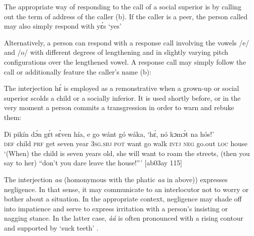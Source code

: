 The appropriate way of responding to the call of a social superior is by calling out the term of address of the caller (b). If the caller is a peer, the person called may also simply respond with yɛ́s ‘yes’



\ea%
    \label{ex:key:1652}
\z\z

Alternatively, a person can respond with a response call involving the vowels /e/ and /o/ with different degrees of lengthening and in slightly varying pitch configurations over the lengthened vowel. A response call may simply follow the call or additionally feature the caller’s name (b):


\ea%
    \label{ex:key:1653}
\z\z

The interjection hɛ́ is employed as a remonstrative when a grown-up or social superior scolds a child or a socially inferior. It is used shortly before, or in the very moment a person commits a transgression in order to warn and rebuke them: 


\ea%
    \label{ex:key:1654}
    \gll Di  pikín  dɔ́n  gɛ́t  sɛ́ven  hía,    e    go  wánt  gó  wáka,
‘hɛ́,  nó  kɔmɔ́t  na  hós!’\\
\textsc{def}  child  \textsc{prf}  get  seven  year    \textsc{3sg.sbj}  \textsc{pot}  want  go  walk
\textsc{intj}  \textsc{neg}  go.out  \textsc{loc}  house\\
\glt ‘(When) the child is seven years old, she will want to roam the streets, 
(then you say to her) “don’t you dare leave the house!”’ [ab03ay 115]
\z

The interjection \textit{aa} (homonymous with the phatic \textit{aa} in  above)) expresses negligence. In that sense, it may communicate to an interlocutor not to worry or bother about a situation. In the appropriate context, negligence may shade off into impatience and serve to express irritation with a person’s insisting or nagging stance. In the latter case, \textit{àá} is often pronounced with a rising contour and supported by ‘suck teeth’ . 


